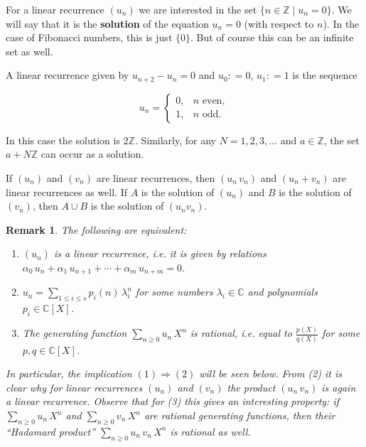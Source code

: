 \documentclass{article}
\newcommand{\term}{\textbf}
\newcommand{\dfn}{\mathrel{\mathop:}=}
\newcommand{\ZZ}{\mathbb{Z}}
\newcommand{\examplesymbol}{$\blacktriangle$}
\renewcommand{\qedsymbol}{$\blacksquare$}
\theoremstyle{myplain}
\theoremstyle{mydefinition}
\newtheorem{remark}[proposition]{Remark}
\newenvironment{example}
  {\pushQED{\qed}\renewcommand{\qedsymbol}{\examplesymbol}\examplex}
  {\popQED\endexamplex}
\begin{document}
For a linear recurrence $(u_n)$ we are interested in the set
$\{ n \in \ZZ \mid u_n = 0 \}$. We will say that it is the \term{solution} of
the equation $u_n = 0$ (with respect to $n$). In the case of Fibonacci numbers,
this is just $\{ 0 \}$. But of course this can be an infinite set as well.

\begin{example}
  A linear recurrence given by $u_{n+2} - u_n = 0$ and $u_0 \dfn 0$,
  $u_1 \dfn 1$ is the sequence

  \[ u_n = \left\{\begin{array}{ll}
                    0, & n \text{ even},\\
                    1, & n \text{ odd}.
                  \end{array}\right. \]

  In this case the solution is $2\ZZ$. Similarly, for any
  $N = 1, 2, 3, \ldots$ and $a \in \ZZ$, the set $a + N \ZZ$ can occur as a
  solution.
\end{example}

If $(u_n)$ and $(v_n)$ are linear recurrences, then $(u_n\,v_n)$ and
$(u_n + v_n)$ are linear recurrences as well. If $A$ is the solution of $(u_n)$
and $B$ is the solution of $(v_n)$, then $A \cup B$ is the solution of
$(u_n v_n)$.

\begin{remark}\label{remark:linear-recurrences-generating-functions}
  The following are equivalent:
  \begin{enumerate}
  \item[(1)] $(u_n)$ is a linear recurrence, i.e. it is given by relations
    $\alpha_0\,u_n + \alpha_1\,u_{n+1} + \cdots + \alpha_m\,u_{n+m} = 0$.

  \item[(2)] $u_n = \sum_{1 \le i \le s} p_i (n) \, \lambda_i^n$ for some
    numbers $\lambda_i \in \mathbb{C}$ and polynomials $p_i \in \mathbb{C} [X]$.

  \item[(3)] The generating function $\sum_{n \ge 0} u_n \, X^n$ is rational,
    i.e. equal to $\frac{p (X)}{q (X)}$ for some $p, q \in \mathbb{C} [X]$.
  \end{enumerate}

  In particular, the implication $(1) \Rightarrow (2)$ will be seen below. From
  (2) it is clear why for linear recurrences $(u_n)$ and $(v_n)$ the product
  $(u_n\,v_n)$ is again a linear recurrence. Observe that for (3) this gives an
  interesting property: if $\sum_{n \ge 0} u_n \, X^n$ and
  $\sum_{n \ge 0} v_n \, X^n$ are rational generating functions, then their
  ``Hadamard product'' $\sum_{n \ge 0} u_n\,v_n \, X^n$ is rational as well.
\end{remark}
\end{document}
